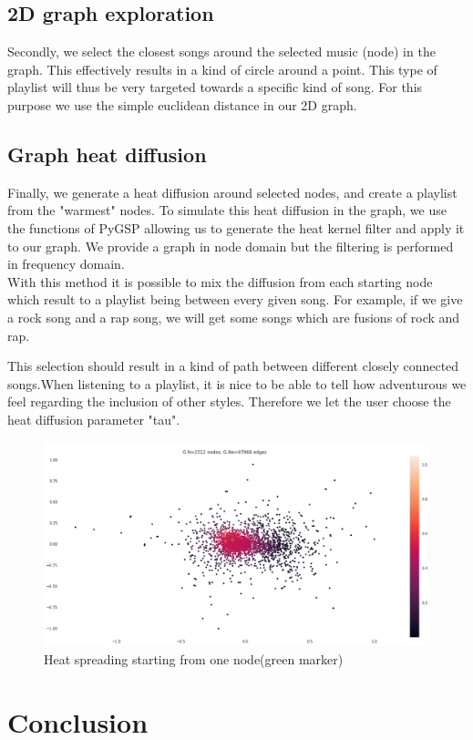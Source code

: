 \subsection{2D graph exploration}
Secondly, we select the closest songs around the selected music (node) in the graph. This effectively results in a kind of circle around a point. This type of playlist will thus be very targeted towards a specific kind of song. For this purpose we use the simple euclidean distance in our 2D graph.

\subsection{Graph heat diffusion}
Finally, we generate a heat diffusion around selected nodes, and create a playlist from the "warmest" nodes. To simulate this heat diffusion in the graph, we use the functions of PyGSP allowing us to generate the heat kernel filter and apply it to our graph. We provide a graph in node domain but the filtering is performed in frequency domain.\\

With this method it is possible to mix the diffusion from each starting node which result to a playlist being between every given song. For example, if we give a rock song and a rap song, we will get some songs which are fusions of rock and rap.

This selection should result in a kind of path between different closely connected songs.When listening to a playlist, it is nice to be able to tell how adventurous we feel regarding the inclusion of other styles. Therefore we let the user choose the heat diffusion parameter "tau". 

\begin{figure}[H]
  \centering
    \includegraphics[width=\textwidth]{./Figures/heat}
  \caption{Heat spreading starting from one node(green marker)}
  \label{fig:}
\end{figure}

\newpage
\section{Conclusion}

